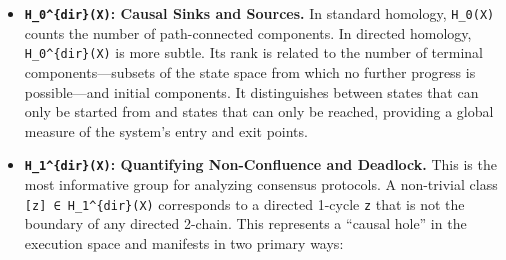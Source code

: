 \documentclass[
]{article}
\begin{document}
\begin{itemize}
\item
  \textbf{\texttt{H\_0\^{}\{dir\}(X)}: Causal Sinks and Sources.} In
  standard homology, \texttt{H\_0(X)} counts the number of
  path-connected components. In directed homology,
  \texttt{H\_0\^{}\{dir\}(X)} is more subtle. Its rank is related to the
  number of terminal components---subsets of the state space from which
  no further progress is possible---and initial components. It
  distinguishes between states that can only be started from and states
  that can only be reached, providing a global measure of the system's
  entry and exit points.
\item
  \textbf{\texttt{H\_1\^{}\{dir\}(X)}: Quantifying Non-Confluence and
  Deadlock.} This is the most informative group for analyzing consensus
  protocols. A non-trivial class \texttt{{[}z{]}\ ∈\ H\_1\^{}\{dir\}(X)}
  corresponds to a directed 1-cycle \texttt{z} that is not the boundary
  of any directed 2-chain. This represents a ``causal hole'' in the
  execution space and manifests in two primary ways:


\end{itemize}
\end{document}

